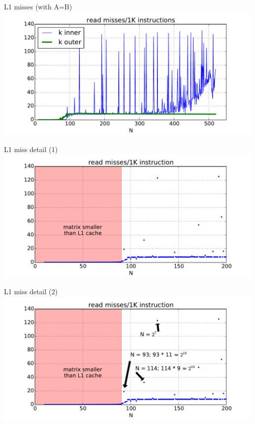 

\begin{frame}{L1 misses (with A=B)}
\includegraphics[width=0.99\textwidth]{../caching/k-inout-l1d_read_miss_rate}
\end{frame}

\begin{frame}{L1 miss detail (1)}
\includegraphics[width=0.99\textwidth]{../caching/k-in-l1d-miss-annot-size}
\end{frame}

\begin{frame}{L1 miss detail (2)}
\includegraphics[width=0.99\textwidth]{../caching/k-in-l1d-miss-annot4-size}
\end{frame}

